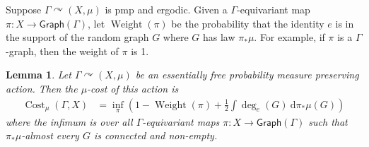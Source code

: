 \documentclass[12pt]{article}
\theoremstyle{plain}
\newtheorem{lem}[thm]{Lemma}
\theoremstyle{definition}
\theoremstyle{remark}
\newtheorem{remark}{Remark}
\newcommand{\G}{\Gamma}
\newcommand\cost{{\operatorname{Cost}}}
\def\cc{{\curvearrowright}}
\newcommand{\dee}{\textrm{d}}
\begin{document}
Suppose $\G \cc (X, \mu)$ is pmp and ergodic. Given a $\G$-equivariant map $\pi: X \to \textsf{Graph}(\G)$, let $\operatorname{Weight}(\pi)$ be the probability that the identity $e$ is in the support of the random graph $G$ where $G$ has law $\pi_*\mu$. For example, if $\pi$ is a $\G$-graph, then the weight of $\pi$ is 1.  %






    

\begin{lem}\label{weight-cost}
    Let $\G \cc (X,\mu)$ be an essentially free probability measure preserving action. Then the $\mu$-cost of this action is
    \begin{align}\label{weight}
   \cost_\mu(\G,X) &=  \inf_\pi\left(1-\operatorname{Weight}(\pi)+ \frac{1}{2}\int \deg_e(G)~\dee \pi_*\mu(G) \right)
    \end{align}
    where the infimum is     over all $\G$-equivariant maps $\pi:X \to \mathsf{Graph}(\G)$ such that $\pi_*\mu$-almost every $G$ is connected and non-empty.
\end{lem}
\end{document}
